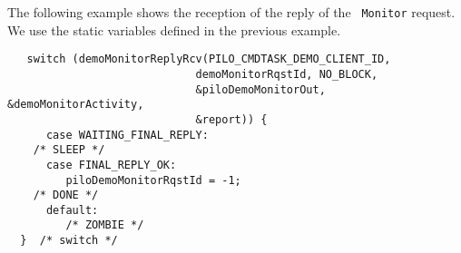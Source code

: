The  following  example shows the  reception   of the  reply of  the {\tt
Monitor}  request.  We   use the static
variables defined in the previous example.


\begin{center}\begin{cartouche}\small\begin{verbatim}
   switch (demoMonitorReplyRcv(PILO_CMDTASK_DEMO_CLIENT_ID, 
                             demoMonitorRqstId, NO_BLOCK,
                             &piloDemoMonitorOut, &demoMonitorActivity, 
                             &report)) {
      case WAITING_FINAL_REPLY:
	/* SLEEP */
      case FINAL_REPLY_OK:
         piloDemoMonitorRqstId = -1;
	/* DONE */
      default:
         /* ZOMBIE */
  }  /* switch */
\end{verbatim}\end{cartouche}\end{center}


